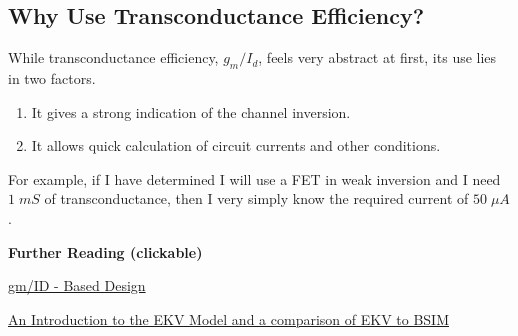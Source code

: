 \documentclass[11pt]{article}
\begin{document}
\subsection{Why Use Transconductance Efficiency?}

While transconductance efficiency, $g_m/I_d$, feels very abstract at first, its use lies in two factors.

\begin{enumerate}
  \item It gives a strong indication of the channel inversion.
  \item It allows quick calculation of circuit currents and other conditions.
\end{enumerate}

For example, if I have determined I will use a FET in weak inversion and I need $1 \; mS$ of transconductance, then I very simply know the required current of $50 \; \mu A$.


\textbf{Further Reading (clickable)}

\hspace{1cm} \href{http://web02.gonzaga.edu/faculty/talarico/EE406/documents/gmid.pdf}{gm/ID - Based Design}

\hspace{1cm} \href{http://web.eecs.utk.edu/~bblalock/ece532/ece532_pres_ekv_bsim.pdf}{An Introduction to the EKV Model and a comparison of EKV to BSIM}
\end{document}

